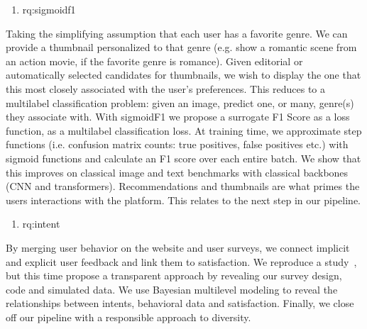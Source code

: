 
\begin{enumerate}[label=\textbf{RQ\arabic*},ref={RQ\arabic*},resume,leftmargin=*]
	\item \acl{rq:sigmoidf1}\label{rq:sigmoidf1}
\end{enumerate}

Taking the simplifying assumption that each user has a favorite genre. We can provide a thumbnail personalized to that genre (e.g. show a romantic scene from an action movie, if the favorite genre is romance). Given editorial or automatically selected candidates for thumbnails, we wish to display the one that this most closely associated with the user's preferences. This reduces to a multilabel classification problem: given an image, predict one, or many, genre(s) they associate with. With sigmoidF1 we propose a surrogate F1 Score as a loss function, as a multilabel classification loss. At training time, we approximate step functions (i.e. confusion matrix counts: true positives, false positives etc.) with sigmoid functions and calculate an F1 score over each entire batch. We show that this improves on classical image and text benchmarks with classical backbones (CNN and transformers). Recommendations and thumbnails are what primes the users interactions with the platform. This relates to the next step in our pipeline.


\begin{enumerate}[label=\textbf{RQ\arabic*},ref={RQ\arabic*},resume,leftmargin=*]
	\item \acl{rq:intent}\label{rq:intent}
  \end{enumerate}

By merging user behavior on the website and user surveys, we connect implicit and explicit user feedback and link them to satisfaction. We reproduce a study~\cite{spotifyIntent}, but this time propose a transparent approach by revealing our survey design, code and simulated data. We use Bayesian multilevel modeling to reveal the relationships between intents, behavioral data and satisfaction. Finally, we close off our pipeline with a responsible approach to diversity.

